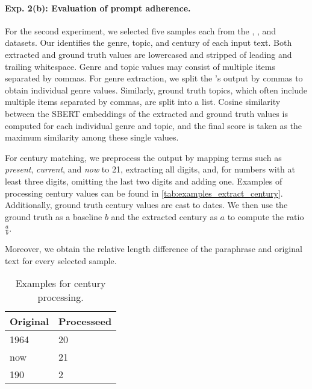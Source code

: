 \paragraph{Exp. 2(b): Evaluation of prompt adherence.}
For the second experiment, we selected five samples each from the \dataBlog{}, \dataGutenberg{}, and \dataStudent{} datasets. 
Our \pextractor{} identifies the genre, topic, and century of each input text. 
Both extracted and ground truth values are lowercased and stripped of leading and trailing whitespace. 
Genre and topic values may consist of multiple items separated by commas. 
For genre extraction, we split the \pextractor{}'s output by commas to obtain individual genre values. 
Similarly, ground truth topics, which often include multiple items separated by commas, are split into a list. 
Cosine similarity between the SBERT embeddings of the extracted and ground truth values is computed for each individual genre and topic, and the final score is taken as the maximum similarity among these single values. 

For century matching, we preprocess the \pextractor{} output by mapping terms such as \textit{present}, \textit{current}, and \textit{now} to 21, extracting all digits, and, for numbers with at least three digits, omitting the last two digits and adding one. 
Examples of processing century values can be found in \autoref{tab:examples_extract_century}. 
Additionally, ground truth century values are cast to dates. 
We then use the ground truth as a baseline $b$ and the extracted century as $a$ to compute the ratio $\frac{a}{b}$.

Moreover, we obtain the relative length difference of the paraphrase and original text for every selected sample. 

\begin{table}[h]
\centering
\caption{Examples for century processing.}
\label{tab:examples_extract_century}
\begin{tabular}{ll}
    \toprule
\textbf{Original} & \textbf{Processeed} \\
\midrule
1964              & 20                  \\
now               & 21                  \\
190               & 2     \\
\bottomrule             
\end{tabular}%
\end{table}

